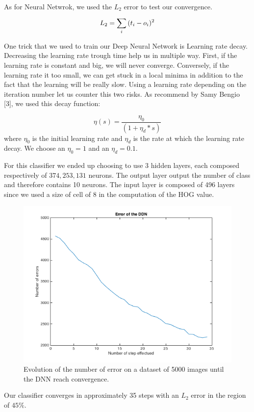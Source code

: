 \documentclass{article} %
\begin{document}
As for Neural Netwrok, we used the $L_2$ error to test our convergence.
 $$L_2 = \sum^{}_{i}{(t_i-o_i)^2}$$

One trick that we used to train our Deep Neural Network is Learning rate decay. Decreasing the learning rate trough time help us in multiple way. First, if the learning rate is constant and big, we will never converge. Conversely, if the learning rate it too small, we can get stuck in a local minima in addition to the fact that the learning will be really slow. Using a learning rate depending on the iteration number let us counter this two risks.
As recommend by Samy Bengio [3], we used this decay function:

$$\eta(s)=\dfrac{\eta_0}{(1+\eta_d*s)}$$ 
where $\eta_0$ is the initial learning rate and $\eta_d$ is the rate at which the learning rate decay. 
We choose an $\eta_0 = 1$ and an $\eta_d = 0.1$.

For this classifier we ended up choosing to use 3 hidden layers, each composed respectively of $374, 253, 131$ neurons. The output layer output the number of class and therefore contains 10 neurons. The input layer is composed of 496 layers since we used a size of cell of 8 in the computation of the HOG value. 

\begin{figure}
\centering
\includegraphics[scale=0.55]{ErrorDNN.png}
\caption{Evolution of the number of error on a dataset of 5000 images until the DNN reach convergence. }
\end{figure}

Our classifier converges in approximately 35 steps with an $L_2$ error in the region of $45\%$.
\end{document}
